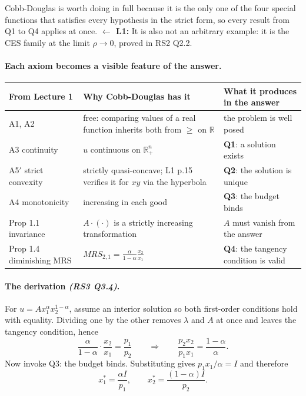 \documentclass[11pt]{article}
\theoremstyle{definition}
\newcommand{\R}{\mathbb{R}}
\newcommand{\Rn}{\mathbb{R}^n_+}
\newcommand{\src}[1]{\textit{\small (#1)}}
\newcommand{\back}[1]{\textbf{\small $\leftarrow$ L1:} \small #1}
\begin{document}
Cobb-Douglas is worth doing in full because it is the only one of the four special functions
that satisfies every hypothesis in the strict form, so every result from Q1 to Q4 applies at
once. \back{It is also not an arbitrary example: it is the CES family at the limit
$\rho\to0$, proved in RS2 Q2.2.}

\paragraph{Each axiom becomes a visible feature of the answer.}

\begin{center}
\begin{tabular}{@{}p{3.0cm}p{5.3cm}p{5.9cm}@{}}
\toprule
\textbf{From Lecture 1} & \textbf{Why Cobb-Douglas has it} & \textbf{What it produces in the answer} \\
\midrule
A1, A2 & free: comparing values of a real function inherits both from $\ge$ on $\R$ & the problem is well posed \\[3pt]
A3 continuity & $u$ continuous on $\Rn$ & \textbf{Q1}: a solution exists \\[3pt]
A5$'$ strict convexity & strictly quasi-concave; L1 p.15 verifies it for $xy$ via the hyperbola & \textbf{Q2}: the solution is unique \\[3pt]
A4 monotonicity & increasing in each good & \textbf{Q3}: the budget binds \\[3pt]
Prop 1.1 invariance & $A\cdot(\cdot)$ is a strictly increasing transformation & $A$ must vanish from the answer \\[3pt]
Prop 1.4 diminishing MRS & $MRS_{2,1}=\tfrac{\alpha}{1-\alpha}\tfrac{x_2}{x_1}$ & \textbf{Q4}: the tangency condition is valid \\
\bottomrule
\end{tabular}
\end{center}

\paragraph{The derivation \src{RS3 Q3.4}.} For $u=Ax_1^{\alpha}x_2^{1-\alpha}$, assume an
interior solution so both first-order conditions hold with equality. Dividing one by the
other removes $\lambda$ and $A$ at once and leaves the tangency condition, hence
\[
\frac{\alpha}{1-\alpha}\cdot\frac{x_2}{x_1}=\frac{p_1}{p_2}
\qquad\Longrightarrow\qquad
\frac{p_2x_2}{p_1x_1}=\frac{1-\alpha}{\alpha}.
\]
Now invoke Q3: the budget binds. Substituting gives $p_1x_1/\alpha=I$ and therefore
\[
x_1^*=\frac{\alpha I}{p_1},\qquad x_2^*=\frac{(1-\alpha)I}{p_2}.
\]
\end{document}
